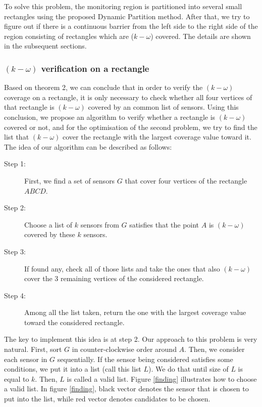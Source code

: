 To solve this problem, the monitoring region is partitioned into several small rectangles using the proposed Dynamic Partition method. After that, we try to figure out if there is a continuous barrier from the left side to the right side of the region consisting of rectangles which are ($k-\omega$) covered. The details are shown in the subsequent sections.

\subsubsection{$(k-\omega)$ verification on a rectangle}
Based on theorem 2, we can conclude that in order to verify the $(k-\omega)$ coverage on a rectangle, it is only necessary to check whether all four vertices of that rectangle is $(k-\omega)$ covered by an common list of sensors. Using this conclusion, we propose an algorithm to verify whether a rectangle is $(k-\omega)$ covered or not, and for the optimisation of the second problem, we try to find the list that $(k-\omega)$ cover the rectangle with the largest coverage value toward it. 
The idea of our algorithm can be described as follows:
\begin{description}
	\item[Step 1:] First, we find a set of sensors $G$ that cover four vertices of the rectangle $ ABCD $.
	\item[Step 2:] Choose a list of $k$ sensors from $G$ satisfies that the point $A$ is $(k-\omega)$ covered by these $k$ sensors.
	\item[Step 3:] If found any, check all of those lists and take the ones that also $(k-\omega)$ cover the 3 remaining vertices of the considered rectangle.
	\item[Step 4:] Among all the list taken, return the one with the largest coverage value toward the considered rectangle.
\end{description}
The key to implement this idea is at step 2. Our approach to this problem is very natural. First, sort $G$ in counter-clockwise order around $A$. Then, we consider each sensor in $G$ sequentially. If the sensor being considered satisfies some conditions, we put it into a list (call this list $L$). We do that until size of $L$ is equal to $k$. Then, $L$ is called a valid list. Figure \ref{finding} illustrates how to choose a valid list. In figure \ref{finding}, black vector denotes the sensor that is chosen to put into the list, while red vector denotes candidates to be chosen.

